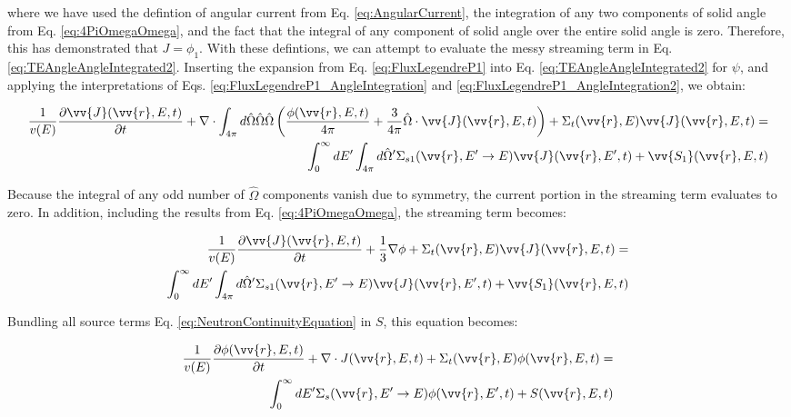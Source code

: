 \documentclass[10pt]{article}
\begin{document}
\begin{flushleft}
where we have used the defintion of angular current from Eq. \ref{eq:AngularCurrent}, the integration of any two components of solid angle from Eq. \ref{eq:4PiOmegaOmega}, and the fact that the integral of any component of solid angle over the entire solid angle is zero. Therefore, this has demonstrated that \(J=\phi_1\). With these defintions, we can attempt to evaluate the messy streaming term in Eq. \ref{eq:TEAngleAngleIntegrated2}. Inserting the expansion from Eq. \ref{eq:FluxLegendreP1} into Eq. \ref{eq:TEAngleAngleIntegrated2} for \(\psi\), and applying the interpretations of Eqs. \ref{eq:FluxLegendreP1_AngleIntegration} and \ref{eq:FluxLegendreP1_AngleIntegration2}, we obtain:

\begin{equation}
\label{eq:P1a}
\begin{aligned}
\frac{1}{v(E)} \frac{\partial\vv{J}(\vv{r}, E, t)}{\partial t} +
 \nabla\cdot \int_{4\pi}^{} d\hat{\Omega} \hat{\Omega}\hat{\Omega}\left(\frac{\phi(\vv{r}, E, t)}{4\pi} + \frac{3}{4\pi} \hat{\Omega}\cdot\vv{J}(\vv{r}, E, t)\right) + 
 \Sigma_t(\vv{r},E)\vv{J}(\vv{r}, E, t) = \\
 \int_{0}^{\infty}dE' \int_{4\pi}^{ } d\hat{\Omega}' \Sigma_{s1}(\vv{r}, E'\rightarrow E)\vv{J}(\vv{r}, E', t) + \vv{S_1}(\vv{r}, E, t)
\end{aligned}
\end{equation}

Because the integral of any odd number of \(\hat{\Omega}\) components vanish due to symmetry, the current portion in the streaming term evaluates to zero. In addition, including the results from Eq. \ref{eq:4PiOmegaOmega}, the streaming term becomes:

\begin{equation}
\label{eq:P1b}
\begin{aligned}
\frac{1}{v(E)} \frac{\partial\vv{J}(\vv{r}, E, t)}{\partial t} +
 \frac{1}{3}\nabla\phi + 
 \Sigma_t(\vv{r},E)\vv{J}(\vv{r}, E, t) = \\
 \int_{0}^{\infty}dE' \int_{4\pi}^{ } d\hat{\Omega}' \Sigma_{s1}(\vv{r}, E'\rightarrow E)\vv{J}(\vv{r}, E', t) + \vv{S_1}(\vv{r}, E, t)
\end{aligned}
\end{equation}

Bundling all source terms Eq. \ref{eq:NeutronContinuityEquation} in \(S\), this equation becomes:

\begin{equation}
\label{eq:NeutronContinuityEquation_BundledSource}
\begin{aligned}
\frac{1}{v(E)} \frac{\partial\phi(\vv{r}, E, t)}{\partial t} +
 \nabla\cdot J(\vv{r}, E, t) + 
 \Sigma_t(\vv{r},E)\phi(\vv{r}, E, t) = \\
 \int_{0}^{\infty}dE' \Sigma_s(\vv{r}, E'\rightarrow E)\phi(\vv{r}, E', t) + S(\vv{r}, E, t)\\
\end{aligned}
\end{equation}


\end{flushleft}
\end{document}
